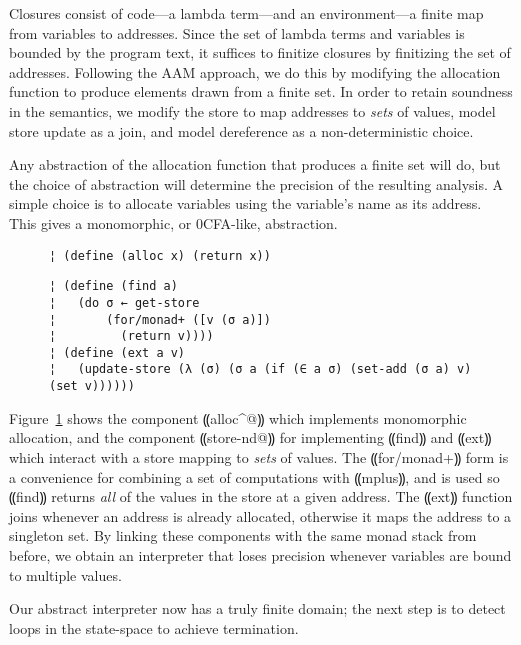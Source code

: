 Closures consist of code---a lambda term---and an environment---a finite map
from variables to addresses.  Since the set of lambda terms and variables is
bounded by the program text, it suffices to finitize closures by finitizing the
set of addresses.  Following the AAM approach, we do this by modifying the
allocation function to produce elements drawn from a finite set.  In order to
retain soundness in the semantics, we modify the store to map addresses to
\emph{sets} of values, model store update as a join, and model dereference as a
non-deterministic choice.

Any abstraction of the allocation function that produces a finite set will do,
but the choice of abstraction will determine the precision of the resulting
analysis.  A simple choice is to allocate variables using the variable's name
as its address.  This gives a monomorphic, or 0CFA-like, abstraction.

\begin{figure} %
\begin{mdframed}
\begin{lstlisting}
¦ (define (alloc x) (return x))
\end{lstlisting}
\figskip{}
\begin{lstlisting}
¦ (define (find a)
¦   (do σ ← get-store
¦       (for/monad+ ([v (σ a)])
¦         (return v))))
¦ (define (ext a v)
¦   (update-store (λ (σ) (σ a (if (∈ a σ) (set-add (σ a) v) (set v))))))
\end{lstlisting}
\label{f:0cfa-abs}
\end{mdframed}
\end{figure} %


Figure~\ref{f:0cfa-abs} shows the component ⸨alloc^@⸩ which implements
monomorphic allocation, and the component ⸨store-nd@⸩ for implementing ⸨find⸩
and ⸨ext⸩ which interact with a store mapping to \emph{sets} of values. The
⸨for/monad+⸩ form is a convenience for combining a set of computations with
⸨mplus⸩, and is used so ⸨find⸩ returns \emph{all} of the values in the store at
a given address.  The ⸨ext⸩ function joins whenever an address is already
allocated, otherwise it maps the address to a singleton set.
By linking these components with the same monad stack from before, we obtain an
interpreter that loses precision whenever variables are bound to multiple
values.

Our abstract interpreter now has a truly finite domain; the next step is to
detect loops in the state-space to achieve termination.

